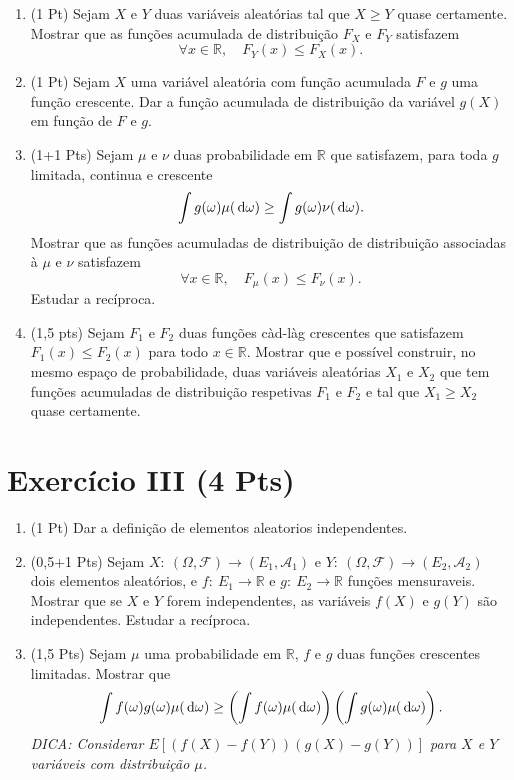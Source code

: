 \documentclass{article}
\newcommand{\dd}{\,\text{\rm d}}
\newcommand{\cA}{\ensuremath{\mathcal A}}
\newcommand{\cF}{\ensuremath{\mathcal F}}
\newcommand{\bbR}{{\ensuremath{\mathbb R}} }
\newcommand{\1}[1]{{\mathbf 1}\left(#1\right)}
\newcommand{\go}{\omega}
\newcommand{\gO}{\Omega}
\begin{document}
\begin{enumerate}

\item (1 Pt) Sejam $X$ e $Y$ duas variáveis aleatórias  tal que $X\ge Y$ quase certamente. Mostrar que as funções acumulada de distribuição
$F_X$ e $F_Y$ satisfazem 
$$\forall x \in \bbR, \quad F_Y(x)\le F_X(x).$$ 
\item (1 Pt) Sejam $X$ uma variável aleatória com função acumulada $F$ e $g$ uma função crescente. Dar a função acumulada de distribuição da variável
$g(X)$ em função de $F$ e $g$.
\item (1+1 Pts) Sejam $\mu$ e $\nu$ duas probabilidade em $\bbR$ que satisfazem, para toda $g$ limitada, continua e crescente 
$$ \int g(\go) \mu(\dd \go)\ge \int g(\go) \nu(\dd \go).$$
Mostrar que as funções acumuladas de distribuição de distribuição associadas à $\mu$ e $\nu$ satisfazem 
$$\forall x \in \bbR, \quad F_{\mu}(x)\le F_{\nu}(x).$$
Estudar a recíproca.

\item (1,5 pts) Sejam $F_1$ e $F_2$ duas funções càd-làg crescentes que satisfazem $F_1(x)\le F_2(x)$ para todo $x\in \bbR$.
Mostrar que e possível construir, no mesmo espaço de probabilidade, duas variáveis aleatórias $X_1$ e $X_2$ que tem funções acumuladas de distribuição
respetivas $F_1$ e $F_2$ e tal que $X_1\ge X_2$ quase certamente.

 
\end{enumerate}



\section*{Exercício III {\small (4 Pts)}}


\begin{enumerate}

\item (1 Pt) Dar a definição de elementos aleatorios independentes.
\item (0,5+1 Pts) Sejam $X:\  (\gO,\cF) \to (E_1,\cA_1)$ e $Y:\  (\gO,\cF) \to (E_2,\cA_2)$ 
 dois elementos aleatórios, e $f:\ E_1 \to \bbR $ e $g:\ E_2 \to \bbR$ funções mensuraveis. 
 Mostrar que se $X$ e $Y$ forem independentes, as variáveis 
$f(X)$ e $g(Y)$ são independentes. Estudar a recíproca.
\item (1,5 Pts) Sejam $\mu$ uma probabilidade em $\bbR$, $f$ e $g$ duas funções crescentes limitadas. Mostrar que 
$$ \int f(\go)g(\go) \mu(\dd \go)\ge  \left(\int f(\go) \mu(\dd \go)\right)\left(\int g(\go) \mu(\dd \go)\right).$$
\textit{DICA: Considerar $E[(f(X)-f(Y))(g(X)-g(Y))]$ para $X$ e $Y$ variáveis com distribuição $\mu$.}

\end{enumerate}
\end{document}
